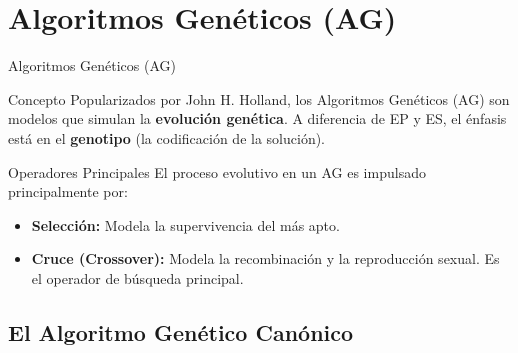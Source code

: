 \documentclass[aspectratio=169,xcolor=dvipsnames]{beamer}
\begin{document}
\section{Algoritmos Genéticos (AG)}

\begin{frame}{Algoritmos Genéticos (AG)}
    \begin{block}{Concepto}
    Popularizados por John H. Holland, los Algoritmos Genéticos (AG) son modelos que simulan la \textbf{evolución genética}. A diferencia de EP y ES, el énfasis está en el \textbf{genotipo} (la codificación de la solución).
    \end{block}
    
    \begin{alertblock}{Operadores Principales}
    El proceso evolutivo en un AG es impulsado principalmente por:
        \begin{itemize}
            \item \textbf{Selección:} Modela la supervivencia del más apto.
            \item \textbf{Cruce (Crossover):} Modela la recombinación y la reproducción sexual. Es el operador de búsqueda principal.
        \end{itemize}
    \end{alertblock}
\end{frame}

\subsection{El Algoritmo Genético Canónico}
\end{document}
